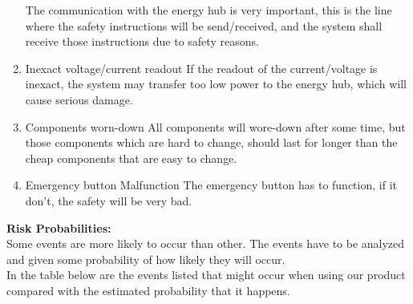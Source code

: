 \documentclass[12pt,a4paper]{report}
\begin{document}
\begin{enumerate}
\subitem The communication with the energy hub is very important, this is the line where the safety instructions will be send/received, and the system shall receive those instructions due to safety reasons. 
\item Inexact voltage/current readout
\subitem If the readout of the current/voltage is inexact, the system may transfer too low power to the energy hub, which will cause serious damage. 
\item Components worn-down
\subitem All components will wore-down after some time, but those components which are hard to change, should last for longer than the cheap components that are easy to change. 
\item Emergency button Malfunction
\subitem The emergency button has to function, if it don’t, the safety will be very bad. 
\end{enumerate}


\textbf{Risk Probabilities:}\\

Some events are more likely to occur than other. The events have to be analyzed and given some probability of how likely they will occur.\\

In the table below are the events listed that might occur when using our product compared with the estimated probability that it happens.\\
\end{document}
